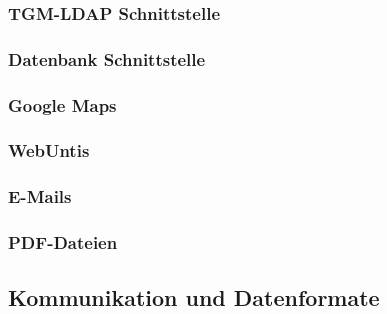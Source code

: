		\subsubsection{TGM-LDAP Schnittstelle}
		\subsubsection{Datenbank Schnittstelle}
		\subsubsection{Google Maps}
		\subsubsection{WebUntis}
		\subsubsection{E-Mails}
		\subsubsection{PDF-Dateien}
	\subsection{Kommunikation und Datenformate}
